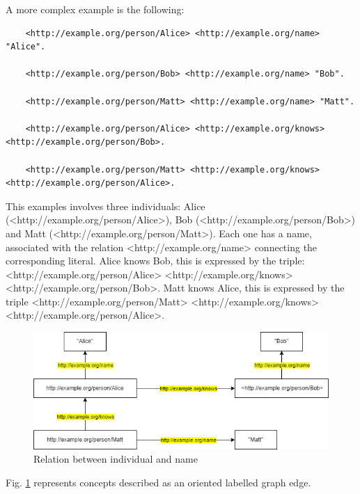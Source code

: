 A more complex example is the following:
\begin{lstlisting}
    <http://example.org/person/Alice> <http://example.org/name> "Alice".

    <http://example.org/person/Bob> <http://example.org/name> "Bob".

    <http://example.org/person/Matt> <http://example.org/name> "Matt".

    <http://example.org/person/Alice> <http://example.org/knows> <http://example.org/person/Bob>.

    <http://example.org/person/Matt> <http://example.org/knows> <http://example.org/person/Alice>.
\end{lstlisting}
This examples involves three individuals: Alice (<http://example.org/person/Alice>), Bob (<http://example.org/person/Bob>) and Matt (<http://example.org/person/Matt>).
Each one has a name, associated with the relation <http://example.org/name> connecting the corresponding literal. Alice knows Bob, this is expressed by the triple: <http://example.org/person/Alice> <http://example.org/knows> <http://example.org/person/Bob>. Matt knows Alice, this is expressed by the triple <http://example.org/person/Matt> <http://example.org/knows> <http://example.org/person/Alice>.


\begin{figure}[H]
    \centering
    \includegraphics[width=0.9\linewidth]{Figures/fig_85.png}
    \caption{Relation between individual and name}
    \label{fig:85}
\end{figure}
Fig. \ref{fig:85} represents concepts described as an oriented labelled graph edge.

